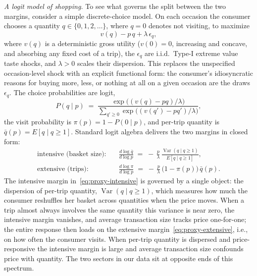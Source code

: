 \documentclass[main.tex]{subfiles}
\begin{document}
\emph{A logit model of shopping.} To see what governs the split between the two margins, consider a simple discrete-choice model.
On each occasion the consumer chooses a quantity $q \in \{0, 1, 2, \ldots\}$, where $q = 0$ denotes not visiting, to maximize
\begin{equation}
v(q) - p\,q + \lambda\,\epsilon_{q},
\end{equation}
where $v(q)$ is a deterministic gross utility ($v(0) = 0$, increasing and concave, and absorbing any fixed cost of a trip), the $\epsilon_{q}$ are i.i.d.\ Type-I extreme value taste shocks, and $\lambda > 0$ scales their dispersion.
This replaces the unspecified occasion-level shock with an explicit functional form: the consumer's idiosyncratic reasons for buying more, less, or nothing at all on a given occasion are the draws $\epsilon_{q}$.
The choice probabilities are logit,
\begin{equation}
P(q \mid p) \;=\; \frac{\exp\!\big((v(q) - p q)/\lambda\big)}{\sum_{q' \geq 0} \exp\!\big((v(q') - p q')/\lambda\big)},
\end{equation}
the visit probability is $\pi(p) = 1 - P(0 \mid p)$, and per-trip quantity is $\bar{q}(p) = E[q \mid q \geq 1]$.
Standard logit algebra delivers the two margins in closed form:
\begin{align}
\text{intensive (basket size):} \quad & \frac{d \log \bar{q}}{d \log p} \;=\; -\,\frac{p}{\lambda}\,\frac{\operatorname{Var}(q \mid q \geq 1)}{E[q \mid q \geq 1]}, \label{eq:proxy-intensive} \\
\text{extensive (trips):} \quad & \frac{d \log \pi}{d \log p} \;=\; -\,\frac{p}{\lambda}\,\big(1 - \pi(p)\big)\,\bar{q}(p). \label{eq:proxy-extensive}
\end{align}
The intensive margin in~\eqref{eq:proxy-intensive} is governed by a single object: the dispersion of per-trip quantity, $\operatorname{Var}(q \mid q \geq 1)$, which measures how much the consumer reshuffles her basket across quantities when the price moves.
When a trip almost always involves the same quantity this variance is near zero, the intensive margin vanishes, and average transaction size tracks price one-for-one; the entire response then loads on the extensive margin~\eqref{eq:proxy-extensive}, i.e., on how often the consumer visits.
When per-trip quantity is dispersed and price-responsive the intensive margin is large and average transaction size confounds price with quantity.
The two sectors in our data sit at opposite ends of this spectrum.
\end{document}
